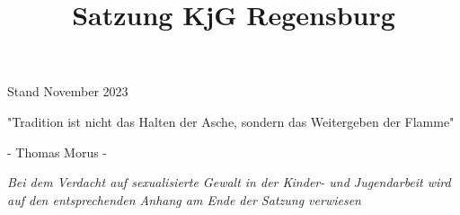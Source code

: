 \documentclass[12pt]{report}
\title{Satzung KjG Regensburg}
\author{}
\begin{document}
 
  \begin{center}
    \pagestyle{empty}
    \BgThispage
    \vspace*{\fill}
    \begin{Huge}
      { \color{kjgtuerkis}  Stand November 2023}
    \end{Huge}
    \vspace*{\fill}
    \newpage
    \pagestyle{empty}
    \vspace*{\fill}
   { \selectfont
     \begin{Huge}
     "Tradition ist nicht das Halten der Asche, sondern das Weitergeben der Flamme"
     \end{Huge}
    }
    \newline
    \begin{large}
      - Thomas Morus -
    \end{large}
    \vspace*{\fill}
  \end{center}

  \tableofcontents
  \begin{flushleft}
   \it{ Bei dem Verdacht auf sexualisierte Gewalt in der Kinder- und Jugendarbeit wird auf den entsprechenden
        Anhang am Ende der Satzung verwiesen}
  \end{flushleft}
  \newpage  
  \setcounter{page}{1}
\end{document}
